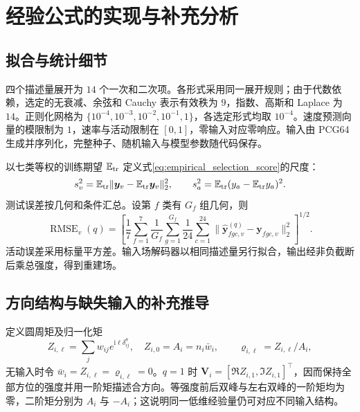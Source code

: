 \documentclass[UTF8,fontset=windows,11pt]{ctexart}
\begin{document}
\appendix
\section{经验公式的实现与补充分析}
\subsection{拟合与统计细节}\label{app:empirical_details}
四个描述量展开为 $14$ 个一次和二次项。各形式采用同一展开规则；由于代数依赖，选定的无衰减、余弦和 Cauchy 表示有效秩为 $9$，指数、高斯和 Laplace 为 $14$。正则化网格为 $\{10^{-4},10^{-3},10^{-2},10^{-1},1\}$，各选定形式均取 $10^{-4}$。速度预测向量的模限制为 $1$，速率与活动限制在 $[0,1]$，零输入对应零响应。输入由 PCG64 生成并序列化，完整种子、随机输入与模型参数随代码保存。

以七类等权的训练期望 $\mathbb E_{\rm tr}$ 定义式\eqref{eq:empirical_selection_score}的尺度：
\begin{equation}
 s_v^2=\mathbb E_{\rm tr}\|\boldsymbol y_v-\mathbb E_{\rm tr}\boldsymbol y_v\|_2^2,\qquad
 s_a^2=\mathbb E_{\rm tr}(y_a-\mathbb E_{\rm tr}y_a)^2.
\end{equation}
测试误差按几何和条件汇总。设第 $f$ 类有 $G_f$ 组几何，则
\begin{equation}
 \operatorname{RMSE}_{v}(q)=\left[\frac17\sum_{f=1}^{7}\frac1{G_f}\sum_{g=1}^{G_f}
 \frac1{24}\sum_{c=1}^{24}\|\widehat{\boldsymbol y}^{(q)}_{fgc,v}-\boldsymbol y_{fgc,v}\|_2^2\right]^{1/2}.
 \label{eq:challenge1_vector_error}
\end{equation}
活动误差采用标量平方差。输入场解码器以相同描述量另行拟合，输出经非负截断后乘总强度，得到重建场。

\subsection{方向结构与缺失输入的补充推导}\label{app:direction_structure}
定义圆周矩及归一化矩
\begin{equation}
 Z_{i,\ell}=\sum_jw_{ij}e^{\mathrm i\ell\delta^\theta_{ij}},\quad
 Z_{i,0}=A_i=n_i\bar w_i,\qquad\varrho_{i,\ell}=Z_{i,\ell}/A_i,
 \label{eq:strength_circular_moments}
\end{equation}
无输入时令 $\bar w_i=Z_{i,\ell}=\varrho_{i,\ell}=0$。$q=1$ 时 $\boldsymbol V_i=[\Re Z_{i,1},\Im Z_{i,1}]^\top$，因而保持全部方位的强度并用一阶矩描述合方向。等强度前后双峰与左右双峰的一阶矩均为零，二阶矩分别为 $A_i$ 与 $-A_i$；这说明同一低维经验量仍可对应不同输入结构。
\end{document}
